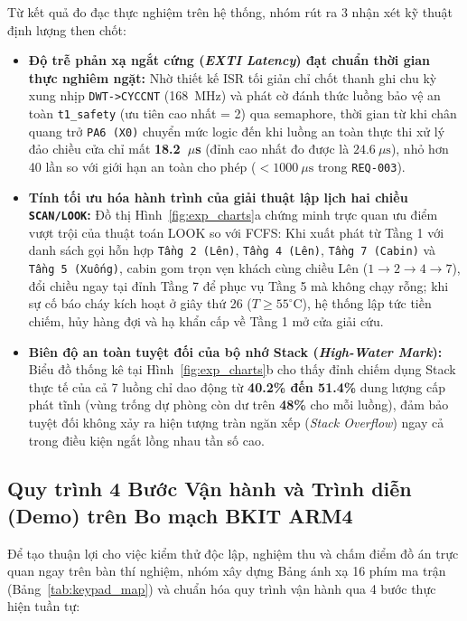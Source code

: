 Từ kết quả đo đạc thực nghiệm trên hệ thống, nhóm rút ra 3 nhận xét kỹ thuật định lượng then chốt:
\begin{itemize}[nosep]
    \item \textbf{Độ trễ phản xạ ngắt cứng (\textit{EXTI Latency}) đạt chuẩn thời gian thực nghiêm ngặt:} Nhờ thiết kế ISR tối giản chỉ chốt thanh ghi chu kỳ xung nhịp \texttt{DWT->CYCCNT} (168~MHz) và phát cờ đánh thức luồng bảo vệ an toàn \texttt{t1\_safety} (ưu tiên cao nhất = 2) qua semaphore, thời gian từ khi chân quang trở \texttt{PA6 (X0)} chuyển mức logic đến khi luồng an toàn thực thi xử lý đảo chiều cửa chỉ mất \textbf{18.2~$\mu$s} (đỉnh cao nhất đo được là $24.6~\mu\text{s}$), nhỏ hơn 40 lần so với giới hạn an toàn cho phép ($< 1000~\mu\text{s}$ trong \texttt{REQ-003}).
    \item \textbf{Tính tối ưu hóa hành trình của giải thuật lập lịch hai chiều \texttt{SCAN/LOOK}:} Đồ thị Hình~\ref{fig:exp_charts}a chứng minh trực quan ưu điểm vượt trội của thuật toán LOOK so với FCFS: Khi xuất phát từ Tầng 1 với danh sách gọi hỗn hợp \texttt{Tầng 2 (Lên)}, \texttt{Tầng 4 (Lên)}, \texttt{Tầng 7 (Cabin)} và \texttt{Tầng 5 (Xuống)}, cabin gom trọn vẹn khách cùng chiều Lên ($1 \rightarrow 2 \rightarrow 4 \rightarrow 7$), đổi chiều ngay tại đỉnh Tầng 7 để phục vụ Tầng 5 mà không chạy rỗng; khi sự cố báo cháy kích hoạt ở giây thứ 26 ($T \ge 55^\circ\text{C}$), hệ thống lập tức tiền chiếm, hủy hàng đợi và hạ khẩn cấp về Tầng 1 mở cửa giải cứu.
    \item \textbf{Biên độ an toàn tuyệt đối của bộ nhớ Stack (\textit{High-Water Mark}):} Biểu đồ thống kê tại Hình~\ref{fig:exp_charts}b cho thấy đỉnh chiếm dụng Stack thực tế của cả 7 luồng chỉ dao động từ \textbf{40.2\% đến 51.4\%} dung lượng cấp phát tĩnh (vùng trống dự phòng còn dư trên \textbf{48\%} cho mỗi luồng), đảm bảo tuyệt đối không xảy ra hiện tượng tràn ngăn xếp (\textit{Stack Overflow}) ngay cả trong điều kiện ngắt lồng nhau tần số cao.
\end{itemize}

\newpage
\subsection{Quy trình 4 Bước Vận hành và Trình diễn (Demo) trên Bo mạch BKIT ARM4}
Để tạo thuận lợi cho việc kiểm thử độc lập, nghiệm thu và chấm điểm đồ án trực quan ngay trên bàn thí nghiệm, nhóm xây dựng Bảng ánh xạ 16 phím ma trận (Bảng~\ref{tab:keypad_map}) và chuẩn hóa quy trình vận hành qua 4 bước thực hiện tuần tự:

